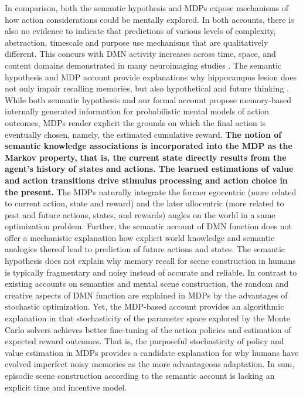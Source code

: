 \documentclass[10pt,letterpaper]{article}
\begin{document}
In comparison,
both the semantic hypothesis and MDPs expose mechanisms of
how action considerations could be mentally explored.
In both accounts,
there is also no evidence to indicate that predictions of various
levels of complexity, abstraction, timescale and purpose
use mechanisms that are qualitatively different. This concurs with
DMN activity increases across time, space, and content domains
demonstrated in many neuroimaging studies \citep{spreng2009common}.
The semantic hypothesis
and MDP account provide explanations why hippocampus lesion does
not only impair recalling memories, but also hypothetical and future
thinking \citep{hassabis2007patients}.
While both semantic hypothesis and
our formal account propose memory-based internally
generated information for probabilistic mental models of action outcomes,
MDPs render explicit the grounds on which the final action is
eventually chosen, namely, the estimated cumulative reward.
\textbf{The notion of semantic knowledge associations is
incorporated into the MDP as the Markov property,
that is, the current state directly results from the
agent's history of states and actions. The learned
estimations of value and action transitions drive
stimulus processing and action choice in the present.}
The MDPs naturally integrate the former egocentric
(more related to current action, state and reward) and the later
allocentric (more related to past and future actions, states, and rewards)
angles on the world in a same optimization problem.
Further,
the semantic account of DMN function does not offer
a mechanistic explanation how explicit world knowledge and semantic analogies thereof
lead to prediction of future actions and states.
The semantic hypothesis does not explain why memory recall
for scene construction in humans is typically fragmentary and noisy
instead of accurate and reliable.
In contrast to existing accounts on semantics and
mental scene construction, the random and creative aspects of DMN function
are explained in MDPs by the advantages of stochastic optimization.
Yet, the MDP-based account provides an algorithmic explanation in that
stochasticity of the parameter space explored
by the Monte Carlo solvers achieves better fine-tuning of the
action policies and estimation of expected reward outcomes.
That is, the purposeful stochasticity of policy and value estimation
in MDPs provides a candidate explanation for why humans
have evolved imperfect noisy memories
as the more advantageous adaptation.
In sum, episodic scene construction according to the semantic
account is lacking an explicit time and incentive model.
\end{document}
